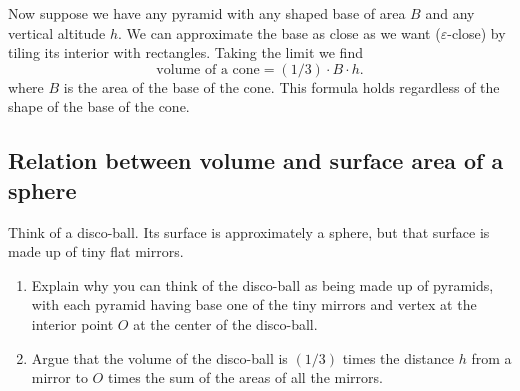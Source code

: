 \documentclass[hints,handout,noauthor,nooutcomes,12pt]{ximera}
\begin{document}
Now suppose we have any pyramid%
with any shaped base of area $B$ and any vertical altitude $h$. We can
approximate the base as close as we want ($\varepsilon$-close) by
tiling its interior with rectangles. Taking the limit we find 
\[
\text{volume of a cone} =\left(  1/3\right)  \cdot B\cdot h.
\]
where $B$ is the area of the base of the cone. This formula holds regardless of the shape of the base of the cone.








\subsection{Relation between volume and surface area of a sphere}

Think of a disco-ball. Its surface is approximately a sphere, but that
surface is made up of tiny flat mirrors.

\begin{problem}\hfil
\begin{enumerate}
\item Explain why you can think of the disco-ball as being made up of
  pyramids, with each pyramid having base one of the tiny mirrors and
  vertex at the interior point $O$ at the center of the disco-ball.
\item Argue that the volume of the disco-ball is $\left( 1/3\right) $
  times the distance $h$ from a mirror to $O$ times the sum of the
  areas of all the mirrors.
\end{enumerate}
\end{problem}
\end{document}
